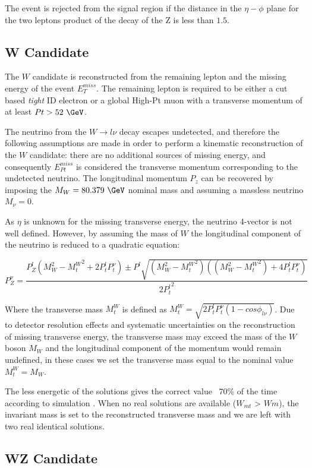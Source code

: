 The event is rejected from the signal region if the distance in the $\eta-\phi$
plane for the two leptons product of the decay of the Z is less than $1.5$.

\subsection{W Candidate}

The $W$ candidate is reconstructed from the remaining lepton and the missing energy
of the event $E_T^{miss}$. The remaining lepton is required to be either a cut based \emph{tight}
ID electron or a global High-Pt muon with a transverse momentum
of at least $Pt>52~\GeV$.

The neutrino from the $W \rightarrow l\nu$ decay escapes undetected,
and therefore the following assumptions are made in order to perform a kinematic
reconstruction of the $W$ candidate: there are no additional sources of missing
energy, and consequently $E_{Pt}^{miss}$ is considered the transverse momentum
corresponding to the undetected neutrino. The longitudinal momentum $P_z$ can be
recovered by imposing the $M_W=80.379~\GeV $ nominal mass and assuming
a massless neutrino $M_\nu = 0.$

As $\eta$ is unknown for the missing transverse energy, the neutrino 4-vector is
not well defined. However, by assuming the mass of $W$ the longitudinal component
of the neutrino is reduced to a quadratic equation:

\[
P_{Z}^{\nu} = \frac{P_{Z}^{l}({M_{W}^{2}-{M_{t}^{W}}^2+2P_{t}^{l}{P_{t}^{\nu}}}) \pm P^{l}\sqrt{(M_{W}^{2}-{M_{t}^{W}}^2)((M_{W}^{2}-{M_{t}^{W}}^2)+4P_{t}^{l}P_{t}^{\nu})}}{{2P_{t}^{l}}^{2}}
\]

Where the transverse mass $M_{t}^{W}$ is defined
as ${M_{t}^{W}}=\sqrt{2P_{t}^{l}P_{t}^{\nu}(1-cos\phi_{l\nu})}$.
Due to detector resolution effects and systematic uncertainties on the
reconstruction of missing transverse energy, the transverse mass may
exceed the mass of the $W$ boson $M_W$ and the
longitudinal component of the momentum would remain undefined, in these cases
we set the transverse mass equal to the nominal value $M_{t}^{W}=M_W$.

The less energetic of the solutions gives the correct value ~70\% of the time
according to simulation \cite{wprime8TeV}.
When no real solutions are available ($W_{mt}$ > $Wm$), the invariant
mass is set to the reconstructed transverse mass and we are left with two real
identical solutions.

\subsection{WZ Candidate}

